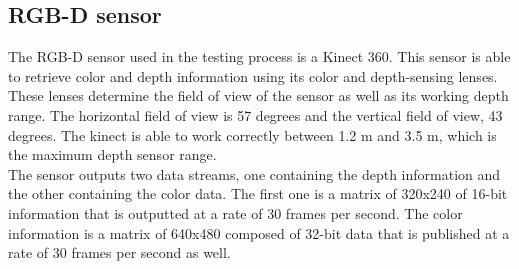 



\subsection{RGB-D sensor}
	The RGB-D sensor used in the testing process is a Kinect 360. 
	This sensor is able to retrieve color and depth information using its color and depth-sensing lenses. 
	These lenses determine the field of view of the sensor as well as its working depth range. 
	The horizontal field of view is 57 degrees and the vertical field of view, 43 degrees. 
	The kinect is able to work correctly between 1.2 m and 3.5 m, which is the maximum depth sensor range. 
	\\

	The sensor outputs two data streams, one containing the depth information and the other containing the color data. 
	The first one is a matrix of 320x240 of 16-bit information that is outputted at a rate of 30 frames per second. 
	The color information is a matrix of 640x480 composed of 32-bit data that is published at a rate of 30 frames per second as well. 

